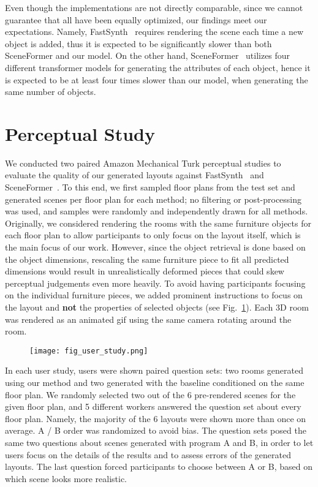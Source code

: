 \documentclass{article}
\newcommand{\figref}[1]{Fig.~\ref{#1}}
\begin{document}
Even though the implementations are not directly comparable, since we cannot
guarantee that all have been equally optimized, our findings meet our
expectations. Namely, FastSynth~\cite{Ritchie2019CVPR} requires rendering the
scene each time a new object is added, thus it is expected to be significantly
slower than both SceneFormer and our model. On the other hand,
SceneFormer~\cite{Wang2020ARXIV} utilizes four different transformer models for
generating the attributes of each object, hence it is expected to be at least
four times slower than our model, when generating the same number of objects.

\section{Perceptual Study}

We conducted two paired Amazon Mechanical Turk perceptual studies to evaluate
the quality of our generated layouts against FastSynth~\cite{Ritchie2019CVPR} and
SceneFormer~\cite{Wang2020ARXIV}. To this end, we first sampled  floor
plans from the test set and generated  scenes per
floor plan for each method; no filtering or post-processing was used, and samples were randomly
and independently drawn for all methods. Originally, we considered rendering
the rooms with the same furniture objects for each floor plan to allow
participants to only focus on the layout itself, which is the main focus of our
work. However, since the object retrieval is done based on the object
dimensions, rescaling the same furniture piece to fit all predicted dimensions
would result in unrealistically deformed pieces that could skew perceptual
judgements even more heavily.
To avoid having participants focusing on the individual furniture pieces, we
added prominent instructions to focus on the layout and \textbf{not} the
properties of selected objects (see \figref{fig:ustudy_ui}). Each 3D room was
rendered as an animated gif using the same camera rotating around the room. 

\begin{figure}[h!]
\centering
  \texttt{[image: fig\_user\_study.png]}
  \vspace{-1.2em}
  \label{fig:ustudy_ui}
\end{figure}

In each user study, users were shown paired question sets: two rooms generated
using our method and two generated with the baseline conditioned on the same
floor plan. We randomly selected two out of the 6 pre-rendered scenes for the
given floor plan, and 5 different workers answered the question set about every
floor plan. Namely, the majority of the 6 layouts were shown more than once on
average. A / B order was randomized to avoid bias. The question sets posed the
same two questions about scenes generated with program A and B, in order to let users focus on
the details of the results and to assess errors of the generated layouts.  The
last question forced participants to choose between A or B, based on which
scene looks more realistic.
\end{document}

